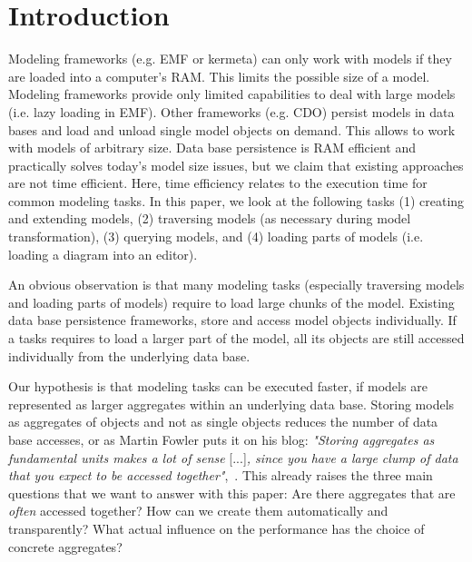 \section{Introduction}

Modeling frameworks (e.g. EMF or kermeta) can only work with models if they are loaded into a computer's RAM. This limits the possible size of a model. 
Modeling frameworks provide only limited capabilities to deal with large models (i.e. lazy loading in EMF). 
Other frameworks (e.g. CDO) persist models in data bases and load and unload single model objects on demand. This allows to work with models of arbitrary size. 
Data base persistence is RAM efficient and practically solves today's model size issues, but we claim that existing approaches are not time efficient. 
Here, time efficiency relates to the execution time for common modeling tasks. In this paper, we look at the following tasks (1) creating and extending models, (2) traversing models (as necessary during model transformation), (3) querying models, and (4) loading parts of models (i.e. loading a diagram into an editor). 

An obvious observation is that many modeling tasks (especially traversing models and loading parts of models) require to load large chunks of the model. Existing data base persistence frameworks, store and access model objects individually. If a tasks requires to load a larger part of the model, all its objects are still accessed individually from the underlying data base.

Our hypothesis is that modeling tasks can be executed faster, if models are represented as larger aggregates within an underlying data base. Storing models as aggregates of objects and not as single objects reduces the number of data base accesses, or as Martin Fowler puts it on his blog: \emph{"Storing aggregates as fundamental units makes a lot of sense} [...]\emph{, since you have a large clump of data that you expect to be accessed together"},~\cite{martinFowler}. This already raises the three main questions that we want to answer with this paper: Are there aggregates that are \emph{often} accessed together? How can we create them automatically and transparently? What actual influence on the performance has the choice of concrete aggregates?

